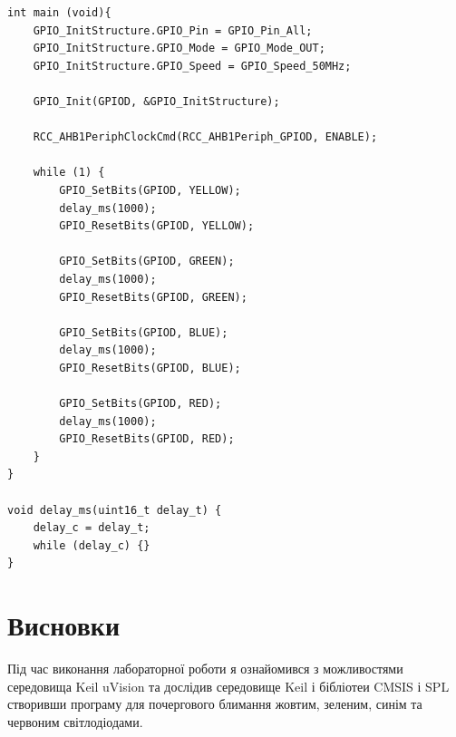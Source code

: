 \documentclass[oneside,14pt]{extarticle}
\begin{document}
\begin{normalsize}
{\begin{lstlisting}
int main (void){
	GPIO_InitStructure.GPIO_Pin = GPIO_Pin_All;
	GPIO_InitStructure.GPIO_Mode = GPIO_Mode_OUT;
	GPIO_InitStructure.GPIO_Speed = GPIO_Speed_50MHz;
	
	GPIO_Init(GPIOD, &GPIO_InitStructure);
	
	RCC_AHB1PeriphClockCmd(RCC_AHB1Periph_GPIOD, ENABLE);
	
	while (1) {
		GPIO_SetBits(GPIOD, YELLOW);
		delay_ms(1000);
		GPIO_ResetBits(GPIOD, YELLOW);
		
		GPIO_SetBits(GPIOD, GREEN);
		delay_ms(1000);
		GPIO_ResetBits(GPIOD, GREEN);
		
		GPIO_SetBits(GPIOD, BLUE);
		delay_ms(1000);
		GPIO_ResetBits(GPIOD, BLUE);
		
		GPIO_SetBits(GPIOD, RED);
		delay_ms(1000);
		GPIO_ResetBits(GPIOD, RED);
	}
}

void delay_ms(uint16_t delay_t) {
	delay_c = delay_t;
	while (delay_c) {}
}
		\end{lstlisting}
	}
	
	\section*{Висновки}
	Під час виконання лабораторної роботи я ознайомився з можливостями середовища Keil uVision та дослідив середовище Keil і бібліотеи CMSIS і SPL створивши програму для почергового блимання жовтим, зеленим, синім та червоним світлодіодами.
	    
\end{normalsize}
\end{document}
